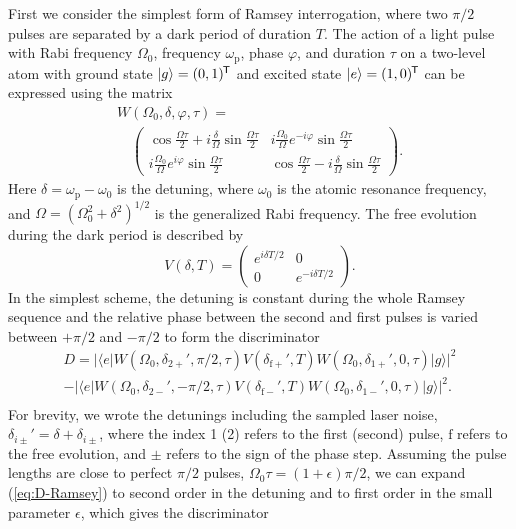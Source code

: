\documentclass[10pt,a4paper]{iopart}
\newcommand{\eqref}[1]{(\ref{#1})}
\newcommand*{\tran}{^{\mkern-1.5mu\mathsf{T}}}
\begin{document}
First we consider the simplest form of Ramsey interrogation, where two $\pi/2$ pulses are separated by a dark period of duration $T$.
The action of a light pulse with Rabi frequency $\Omega_0$, frequency $\omega_\mathrm{p}$, phase $\varphi$, and duration $\tau$ on a two-level atom with ground state $|g\rangle = (0, 1)\tran$ and excited state $|e\rangle = (1, 0)\tran$ can be expressed using the matrix \cite{Yudin2010a,Meystre-EQO}
\begin{eqnarray}
W(\Omega_0,\delta,\varphi,\tau) = \nonumber \\
\quad \left( \begin{array}{cc}
    \cos{\frac{\Omega \tau}{2}} + i\frac{\delta}{\Omega} \sin{\frac{\Omega \tau}{2}} &
    i\frac{\Omega_0}{\Omega} e^{-i\varphi} \sin{\frac{\Omega \tau}{2}} \\
    i\frac{\Omega_0}{\Omega}  e^{i\varphi} \sin{\frac{\Omega \tau}{2}} &
    \cos{\frac{\Omega \tau}{2}} - i\frac{\delta}{\Omega} \sin{\frac{\Omega \tau}{2}}
    \end{array} \right).
\end{eqnarray}
Here $\delta = \omega_\mathrm{p} -\omega_0$ is the detuning, where $\omega_0$ is the atomic resonance frequency, and $\Omega = (\Omega_0^2 + \delta^2)^{1/2}$ is the generalized Rabi frequency. The free evolution during the dark period is described by \cite{Yudin2010a}
\begin{equation}
V(\delta, T) = \left( \begin{array}{cc}
    e^{i \delta T/2} & 0 \\
    0 & e^{-i \delta T/2}
    \end{array} \right).
\end{equation}
In the simplest scheme, the detuning is constant during the whole Ramsey sequence and the relative phase between the second and first pulses is varied between $+\pi/2$ and $-\pi/2$ to form the discriminator
\begin{eqnarray}
D = |\langle e| W(\Omega_0,\delta_{2+}',\pi/2,\tau) V(\delta_{\mathrm{f}+}', T) W(\Omega_0,\delta_{1+}',0,\tau) |g\rangle |^2 \nonumber \\
-|\langle e| W(\Omega_0, \delta_{2-}',-\pi/2,\tau) V(\delta_{\mathrm{f}-}', T) W(\Omega_0,\delta_{1-}',0,\tau) |g\rangle |^2. \nonumber \\
 { }  \label{eq:D-Ramsey}
\end{eqnarray}
For brevity, we wrote the detunings including the sampled laser noise, $\delta_{i\pm}' = \delta + \delta_{i\pm}$, where the index 1 (2) refers to the first (second) pulse, $\mathrm{f}$ refers to the free evolution, and $\pm$ refers to the sign of the phase step. Assuming the pulse lengths are close to perfect $\pi/2$ pulses, $\Omega_0 \tau = (1+\epsilon) \pi/2$, we can expand \eqref{eq:D-Ramsey} to second order in the detuning and to first order in the small parameter $\epsilon$, which gives the discriminator
\end{document}
